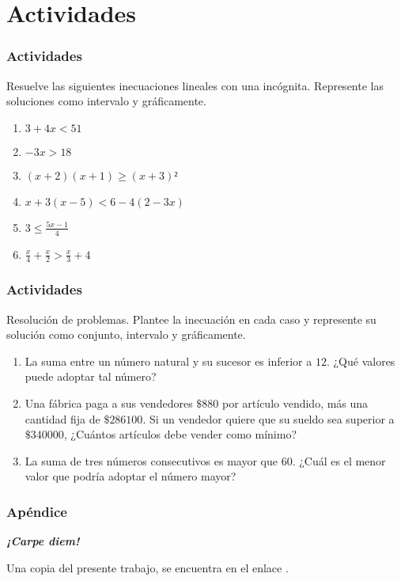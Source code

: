 \documentclass[12pt,spanish,x11names]{beamer}
\def\talktitle{Inecuaciones lineales}
\def\talkpubpdf{https://github.com/hsigrist/LMLA/blob/master/4TP/talks/inecuaciones-lineales.pdf}
\newcommand{\framedhref}[2]{\href{#1}{\fcolorbox{bluu}{bluu}{\textcolor{white}{#2}}}}
\begin{document}
\section{Actividades}
\begin{frame}
  \frametitle{Actividades}
  \begin{exampleblock}{Resuelve las siguientes inecuaciones lineales con una incógnita. Represente las soluciones como intervalo y gráficamente.}
\begin{enumerate}
\item $3+4x<51$
\item $-3x>18$
\item $(x+2)(x+1)\geq(x+3)²$
\item $x+3(x-5)<6-4(2-3x)$
\item $3\leq\frac{5x-1}{4}$
\item $\frac{x}{4}+\frac{x}{2}>\frac{x}{3}+4$
\end{enumerate}
\end{exampleblock}
\end{frame}
\begin{frame}
  \frametitle{Actividades}
  \begin{exampleblock}{Resolución de problemas. Plantee la inecuación en cada
      caso y represente su solución como conjunto, intervalo y gráficamente.}
    \begin{enumerate}
    \item La suma entre un número natural y su sucesor es inferior a $12$. ¿Qué valores
      puede adoptar tal número?
    \item Una fábrica paga a sus vendedores $\$880$ por artículo vendido, más
      una cantidad fija de $\$286100$. Si un vendedor quiere que su sueldo sea
      superior a $\$340000$, ¿Cuántos artículos debe vender como mínimo?
    \item La suma de tres números consecutivos es mayor que $60$. ¿Cuál es el
      menor valor que podría adoptar el número mayor?
    \end{enumerate}
  \end{exampleblock}
\end{frame}
\begin{frame}[c]\frametitle{Apéndice}
\centering\decofourleft\quad\decofourright

\textbf{\emph {¡Carpe diem!}}

Una copia del presente trabajo, se encuentra en el enlace \framedhref{\talkpubpdf}{\talktitle}.
\end{frame}
\end{document}
